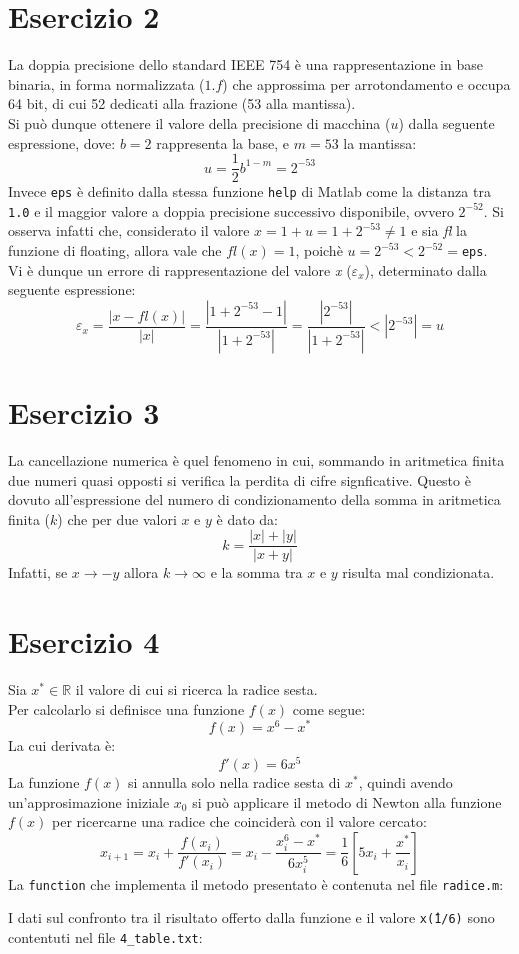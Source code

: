 \documentclass[10pt,a4paper]{article}
\begin{document}
\section*{Esercizio 2}
La doppia precisione dello standard IEEE 754 è una rappresentazione in base binaria, in forma normalizzata ($1.f$) che approssima per arrotondamento e occupa 64 bit, di cui 52 dedicati alla frazione (53 alla mantissa).\\Si può dunque ottenere il valore della precisione di macchina ($u$) dalla seguente espressione, dove: $b=2$ rappresenta la base, e $m=53$ la mantissa:$$u = \frac{1}{2}b^{1-m} = 2^{-53}$$
Invece \texttt{eps} è definito dalla stessa funzione \texttt{help} di Matlab come 	la distanza tra \texttt{1.0} e il maggior valore a doppia precisione successivo disponibile, ovvero $ 2^{-52} $.
Si osserva infatti che, considerato il valore $x = 1+u = 1+2^{-53}\neq 1 $ e sia \textit{fl} la funzione di floating, allora vale che $fl(x)=1 $, poichè $u=2^{-53}<2^{-52}=$\texttt{eps}.\\Vi è dunque un errore di rappresentazione del valore \textit{x} ($\varepsilon_x$), determinato dalla seguente espressione:$$\varepsilon_x=\frac{|x-fl(x)|}{|x|}=\frac{|1+2^{-53}-1|}{|1+2^{-53}|}=\frac{|2^{-53}|}{|1+2^{-53}|}<|2^{-53}|=u$$
\section*{Esercizio 3}La cancellazione numerica è quel fenomeno in cui, sommando in aritmetica finita due numeri quasi opposti si verifica la perdita di cifre signficative. Questo è dovuto all'espressione del numero di condizionamento della somma in aritmetica finita ($k$) che per due valori $x$ e $y$ è dato da:$$k = \frac{|x|+|y|}{|x+y|}$$Infatti, se $x\rightarrow-y$ allora $k\rightarrow\infty$ e la somma tra $x$ e $y$ risulta mal condizionata.
\section*{Esercizio 4}
Sia $x^*\in\mathbb{R}$ il valore di cui si ricerca la radice sesta.\\
Per calcolarlo si definisce una funzione $f(x)$ come segue:
$$f(x) = x^6-x^*$$La cui derivata è:$$f'(x)=6x^5$$La funzione $f(x)$ si annulla solo nella radice sesta di $x^*$, quindi avendo un'approsimazione iniziale $x_0$ si può applicare il metodo di Newton alla funzione $f(x)$ per ricercarne una radice che coinciderà con il valore cercato:
$$x_{i+1}=x_i+\frac{f(x_i)}{f'(x_i)}=x_i-\frac{x_i^6-x^*}{6x_i^5}=\frac{1}{6}\left[5x_i+\frac{x^*}{x_i}\right]$$
La \texttt{function} che implementa il metodo presentato è contenuta nel file \texttt{radice.m}:

\pagebreak
I dati sul confronto tra il  risultato offerto dalla funzione e il valore \texttt{x\^ (1/6)} sono contentuti nel file \texttt{4\_table.txt}:

\end{document}
